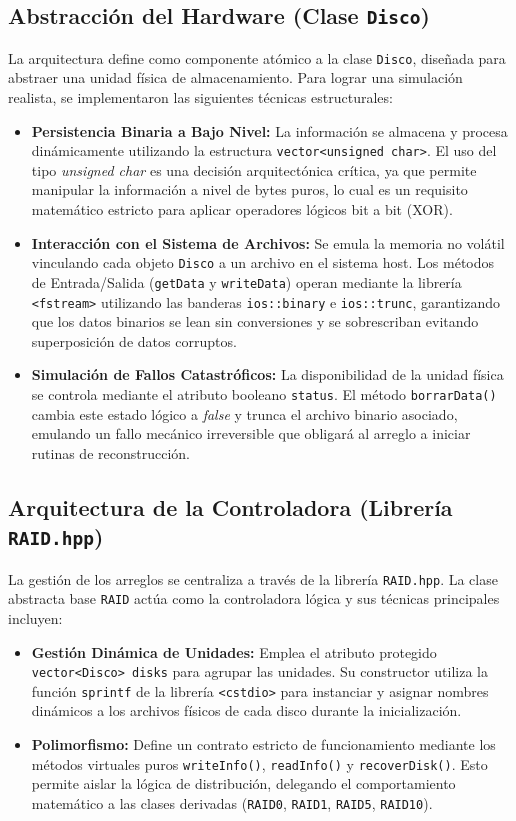 \documentclass[12pt, a4paper]{article}
\begin{document}
\subsection{Abstracción del Hardware (Clase \texttt{Disco})}
La arquitectura define como componente atómico a la clase \texttt{Disco}, diseñada para abstraer una unidad física de almacenamiento. Para lograr una simulación realista, se implementaron las siguientes técnicas estructurales:

\begin{itemize}
    \item \textbf{Persistencia Binaria a Bajo Nivel:} La información se almacena y procesa dinámicamente utilizando la estructura \texttt{vector<unsigned char>}. El uso del tipo \textit{unsigned char} es una decisión arquitectónica crítica, ya que permite manipular la información a nivel de bytes puros, lo cual es un requisito matemático estricto para aplicar operadores lógicos bit a bit (XOR).
    \item \textbf{Interacción con el Sistema de Archivos:} Se emula la memoria no volátil vinculando cada objeto \texttt{Disco} a un archivo en el sistema host. Los métodos de Entrada/Salida (\texttt{getData} y \texttt{writeData}) operan mediante la librería \texttt{<fstream>} utilizando las banderas \texttt{ios::binary} e \texttt{ios::trunc}, garantizando que los datos binarios se lean sin conversiones y se sobrescriban evitando superposición de datos corruptos.
    \item \textbf{Simulación de Fallos Catastróficos:} La disponibilidad de la unidad física se controla mediante el atributo booleano \texttt{status}. El método \texttt{borrarData()} cambia este estado lógico a \textit{false} y trunca el archivo binario asociado, emulando un fallo mecánico irreversible que obligará al arreglo a iniciar rutinas de reconstrucción.
\end{itemize}

\subsection{Arquitectura de la Controladora (Librería \texttt{RAID.hpp})}
La gestión de los arreglos se centraliza a través de la librería \texttt{RAID.hpp}. La clase abstracta base \texttt{RAID} actúa como la controladora lógica y sus técnicas principales incluyen:
\begin{itemize}
    \item \textbf{Gestión Dinámica de Unidades:} Emplea el atributo protegido \texttt{vector<Disco> disks} para agrupar las unidades. Su constructor utiliza la función \texttt{sprintf} de la librería \texttt{<cstdio>} para instanciar y asignar nombres dinámicos a los archivos físicos de cada disco durante la inicialización.
    \item \textbf{Polimorfismo:} Define un contrato estricto de funcionamiento mediante los métodos virtuales puros \texttt{writeInfo()}, \texttt{readInfo()} y \texttt{recoverDisk()}. Esto permite aislar la lógica de distribución, delegando el comportamiento matemático a las clases derivadas (\texttt{RAID0}, \texttt{RAID1}, \texttt{RAID5}, \texttt{RAID10}).
\end{itemize}
\end{document}
